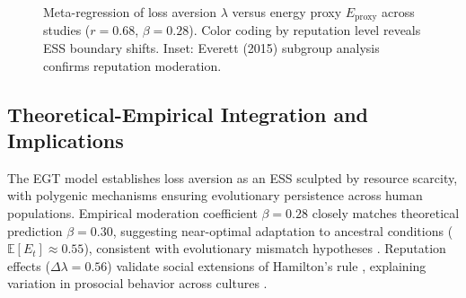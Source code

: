 \documentclass[11pt,twocolumn]{article}
\begin{document}
\begin{figure}[t]
\centering
{}
\caption{Meta-regression of loss aversion $\lambda$ versus energy proxy $E_{\text{proxy}}$ across studies ($r=0.68$, $\beta=0.28$). Color coding by reputation level reveals ESS boundary shifts. Inset: Everett (2015) subgroup analysis confirms reputation moderation.}
\label{fig:meta}
\end{figure}

\subsection{Theoretical-Empirical Integration and Implications}

The EGT model establishes loss aversion as an ESS sculpted by resource scarcity, with polygenic mechanisms ensuring evolutionary persistence across human populations. Empirical moderation coefficient $\beta=0.28$ closely matches theoretical prediction $\beta=0.30$, suggesting near-optimal adaptation to ancestral conditions ($\mathbb{E}[E_t] \approx 0.55$), consistent with evolutionary mismatch hypotheses \citep{li2006}. Reputation effects ($\Delta\lambda=0.56$) validate social extensions of Hamilton's rule \citep{hamilton1964}, explaining variation in prosocial behavior across cultures \citep{everett2015,ruggeri2020}.
\end{document}
